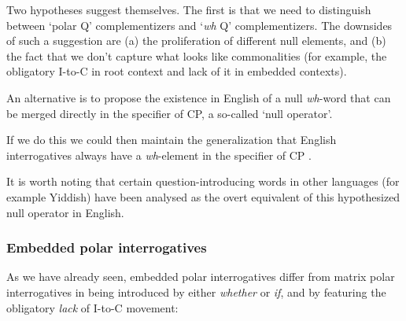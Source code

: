\documentclass{article}
\begin{document}
Two hypotheses suggest themselves.
The first is that we need to distinguish between `polar Q' complementizers and `\emph{wh} Q' complementizers.
The downsides of such a suggestion are (a) the proliferation of different null elements, and (b) the fact that we don't capture what looks like commonalities (for example, the obligatory I-to-C in root context and lack of it in embedded contexts).

An alternative is to propose the existence in English of a null \emph{wh}-word that can be merged directly in the specifier of CP, a so-called `null operator'.
\begin{exe}
\end{exe}
If we do this we could then maintain the generalization that English interrogatives always have a \emph{wh}-element in the specifier of CP .

It is worth noting that certain question-introducing words in other languages (for example Yiddish) have been analysed as the overt equivalent of this hypothesized null operator in English. 

\subsubsection{Embedded polar interrogatives}

As we have already seen, embedded polar interrogatives differ from matrix polar interrogatives in being introduced by either \emph{whether} or \emph{if}, and by featuring the obligatory \emph{lack} of I-to-C movement:
\begin{exe}
\end{exe}
\end{document}
